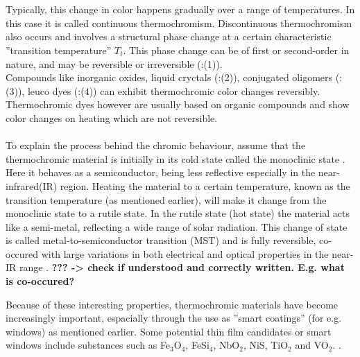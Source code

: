 \cite{White1999}
\\
\\
Typically, this change in color happens gradually over a range of temperatures. In this case it is called
continuous thermochromism. Discontinuous thermochromism also occurs and involves a structural
phase change at a certain characteristic ''transition temperature'' $T_t$. This phase
change can be of first or second-order in nature, and may be reversible or irreversible (\cite{Kiri2010}:(1)). 
\\
Compounds like inorganic oxides, liquid cryctals (\cite{Kiri2010}:(2)), 
conjugated oligomers (\cite{Kiri2010}:(3)), leuco dyes (\cite{Kiri2010}:(4)) can exhibit thermochromic 
color changes reversibly. Thermochromic dyes however are usually based on organic 
compounds and show color changes on heating which are not reversible.
\\
\\
To explain the process behind the chromic behaviour, assume that the thermochromic material is initially 
in its cold state called the monoclinic state . 
Here it behaves as a semiconductor, being less reflective especially in the near-infrared(IR) region. 
Heating the material to a certain temperature, known as the transition temperature 
(as mentioned earlier), will make it change from the monoclinic state to a 
rutile state. In the rutile state (hot state) the material acts like a semi-metal, reflecting 
a wide range of solar radiation. This change of state is called metal-to-semiconductor
transition (MST) \cite[p.~4565]{Blackman2009} and is fully reversible, 
co-occured with large variations in both electrical and optical properties in the near-IR range 
\cite{Morin1959}. 
\textbf{??? -> check if understood and 
correctly written. E.g. what is co-occured?} 

Because of these interesting properties, thermochromic materials have become increasingly important,
espacially through the use as ''smart coatings'' (for e.g. windows) as mentioned earlier.
Some potential thin film candidates or smart windows include substances such as
Fe$_3$O$_4$, FeSi$_4$, NbO$_2$, NiS, TiO$_2$ and VO$_2$. \cite{White1999}.







